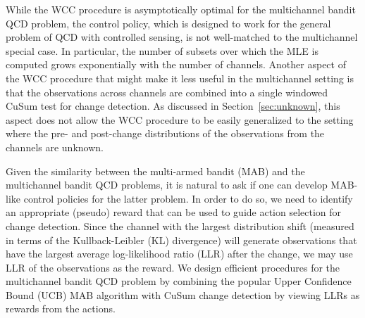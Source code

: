 \documentclass[letterpaper, 10 pt, conference]{ieeeconf}  %
\begin{document}
While the WCC procedure is asymptotically optimal for the multichannel bandit QCD problem, the control policy, which is designed to work for the general problem of QCD with controlled sensing, is not well-matched to the multichannel special case. In particular, the number of subsets over which the MLE is computed grows exponentially with the number of channels. Another aspect of the WCC procedure that might make it less useful in the multichannel setting is that the observations across channels are combined into a single windowed CuSum test for change detection. As discussed in Section~\ref{sec:unknown}, this aspect does not allow the WCC procedure to be easily generalized to the setting where the pre- and post-change distributions of the observations from the channels are unknown.






Given the similarity between the multi-armed bandit (MAB) and the multichannel bandit QCD problems, it is natural to ask if one can develop MAB-like control policies for the latter problem. In order to do so, we need to identify an appropriate (pseudo) reward that can be used to guide action selection for change detection. Since the channel with the largest distribution shift (measured in terms of the Kullback-Leibler (KL) divergence) will generate observations that have the largest average log-likelihood ratio (LLR) after the change, we may use LLR of the observations as the reward. We design efficient procedures for the multichannel bandit QCD problem by combining the popular Upper Confidence Bound (UCB) MAB algorithm with CuSum change detection by viewing LLRs as rewards from the actions. 
\end{document}
